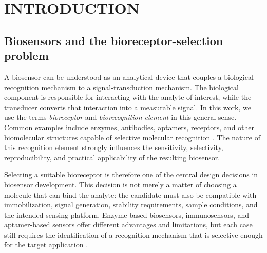 \documentclass[12pt,fleqn]{article}
\renewcommand{\headrulewidth}{0pt}
\begin{document}


\renewcommand{\headrulewidth}{0pt}


\rhead{}

\pagestyle{fancy}



\section{INTRODUCTION}

\subsection{Biosensors and the bioreceptor-selection problem}

A biosensor can be understood as an analytical device that couples a
biological recognition mechanism to a signal-transduction mechanism.
The biological component is responsible for interacting with the
analyte of interest, while the transducer converts that interaction
into a measurable signal. In this work, we use the terms
\emph{bioreceptor} and \emph{biorecognition element} in this general
sense. Common examples include enzymes, antibodies, aptamers,
receptors, and other biomolecular structures capable of selective
molecular recognition
\citep{morales18:_guide_selec_biorec_elemen_biosen}.
The nature of this recognition element strongly influences the
sensitivity, selectivity, reproducibility, and practical applicability
of the resulting biosensor.

Selecting a suitable bioreceptor is therefore one of the central
design decisions in biosensor development. This decision is not merely
a matter of choosing a molecule that can bind the analyte: the
candidate must also be compatible with immobilization, signal
generation, stability requirements, sample conditions, and the
intended sensing platform. Enzyme-based biosensors, immunosensors, and
aptamer-based sensors offer different advantages and limitations, but
each case still requires the identification of a recognition mechanism
that is selective enough for the target application
\citep{morales18:_guide_selec_biorec_elemen_biosen}.
\end{document}
